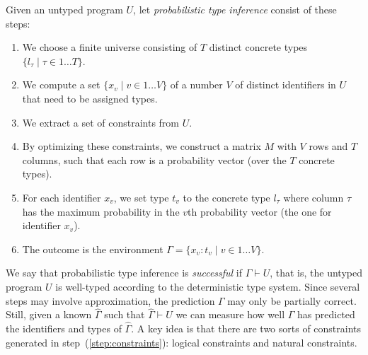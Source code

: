 \documentclass[sigplan,10pt,anonymous]{acmart} %
\theoremstyle{plain}
\theoremstyle{remark}
\theoremstyle{definition}
\begin{document}
Given an untyped program $U$,
let \emph{probabilistic type inference} consist of these steps:
\begin{enumerate}
  \item We choose a finite universe consisting of $T$ distinct concrete types $\{ l_\tau \mid \tau \in 1 \dots T \}$.
  \item We compute a set $\{ x_v \mid v \in 1 \ldots V\}$ of a number $V$ of distinct identifiers in $U$ that need to be assigned types.
  \item \label{step:constraints} We extract a set of constraints from $U$.
  \item \label{step:optimize} By optimizing these constraints, we construct a matrix $M$ with $V$ rows and $T$ columns,
  such that each row is a probability vector (over the $T$ concrete types).
  \item For each identifier $x_v$, we set type $t_v$ to the concrete type $l_\tau$ where column $\tau$ has the maximum probability in the $v$th probability vector (the one for identifier $x_v$).
  \item The outcome is the environment $\Gamma = \{ x_v : t_v \mid v \in 1 \ldots V\}$.
\end{enumerate}

We say that probabilistic type inference is \emph{successful} if $\Gamma \vdash U$, that is, the untyped program $U$ is well-typed according to the deterministic type system.
%
Since several steps may involve approximation, the prediction $\Gamma$ may only be partially correct.
%
Still, given a known $\hat{\Gamma}$ such that $\hat{\Gamma} \vdash U$ we can measure how well $\Gamma$ has predicted the identifiers and types of $\hat{\Gamma}$.
%
A key idea is that there are two sorts of constraints generated in step~(\ref{step:constraints}): logical constraints and natural
constraints.
\end{document}
